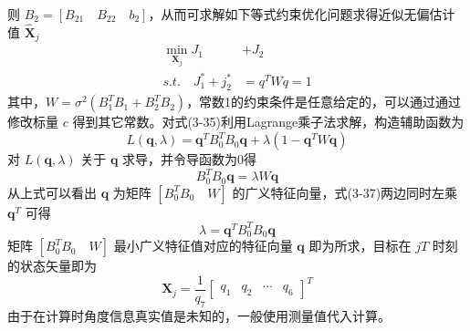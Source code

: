 则 $B_2 = [B_{21} \quad B_{22} \quad b_2]$，从而可求解如下等式约束优化问题求得近似无偏估计值 $\hat{\bm{X}}_j$ \vspace{-12pt}
\begin{equation}
	\begin{split}
		\min_{\bm{X}_j} J_1 &+ J_2 \\
		s.t. \quad J_1^* + j_2^* &= q^T W q =1
	\end{split}
\end{equation}
其中，$W = \sigma^2 (B_1^T B_1 + B_2^T B_2)$，常数1的约束条件是任意给定的，可以通过通过修改标量 $c$ 得到其它常数。对式(3-35)利用Lagrange乘子法求解，构造辅助函数为
\begin{equation}
	L(\bm{q},\lambda) = \bm{q}^T B_0^T B_0 \bm{q} + \lambda(1-\bm{q}^T W \bm{q})
\end{equation}
对 $L(\bm{q},\lambda)$ 关于 $\bm{q}$ 求导，并令导函数为0得
\begin{equation}
	B_0^T B_0 \bm{q} = \lambda W \bm{q}
\end{equation}
从上式可以看出 $\bm{q}$ 为矩阵 $[B_0^TB_0 \quad W]$ 的广义特征向量，式(3-37)两边同时左乘 $\bm{q}^T$ 可得
\begin{equation}
	\lambda = \bm{q}^T B_0^T B_0 \bm{q}
\end{equation}
矩阵 $[B_0^T B_0 \quad W]$ 最小广义特征值对应的特征向量 $\bm{q}$ 即为所求，目标在 $jT$ 时刻的状态矢量即为
\begin{equation}
	\bm{X}_j = \frac{1}{q_7}\left[\begin{array}{cccc}
		q_1 & q_2 & \cdots & q_6
	\end{array}\right] ^T
\end{equation}
由于在计算时角度信息真实值是未知的，一般使用测量值代入计算。